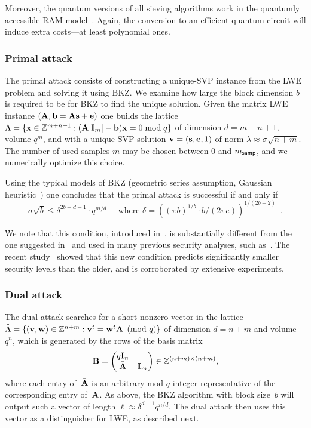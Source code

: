\documentclass{iacrcc}
\begin{document}
Moreover, the quantum versions of all sieving algorithms work in the
quantumly accessible RAM model~\cite{LMP15}. Again, the conversion to
an efficient quantum circuit will induce extra costs---at least
polynomial ones.

\subsubsection{Primal attack}

The primal attack consists of constructing a unique-SVP instance from
the LWE problem and solving it using BKZ. We examine how large the
block dimension $b$ is required to be for BKZ to find the unique
solution. Given the matrix LWE instance
$( \mathbf{A},\mathbf{b} = \mathbf{A} \mathbf{s} + \mathbf{e})$ one builds the lattice
$\Lambda = \{ \mathbf{x} \in \mathbb Z^{m+n+1} : ( \mathbf{A} | \mathbf{I}_m | - \mathbf{b})
\mathbf{x} = 0 \bmod q \}$ of dimension $d = m + n + 1$, volume $q^m$, and
with a unique-SVP solution $\mathbf{v} = (\mathbf{s}, \mathbf{e}, 1 )$ of norm
$\lambda \approx \sigma \sqrt{n+m}$. The number of used samples $m$
may be chosen between $0$ and $m_{\mathsf{samp}}$, and we numerically optimize
this choice.

Using the typical models of BKZ (geometric series assumption, Gaussian
heuristic~\cite{ChenThesis,albrecht15:_concrete_lwe}) one concludes
that the primal attack is successful if and only if
\begin{equation}
  \label{eqn:primal_attack_cond}
  \sigma \sqrt b \leq \delta^{2b-d -1} \cdot q^{m/d} \quad \text{ where } \delta = ((\pi b)^{1/b} \cdot b/(2\pi e))^{1/(2b-2)} \enspace .
\end{equation}

We note that this condition, introduced in~\cite{USENIX:ADPS16}, is
substantially different from the one suggested in~\cite{EC:GamNgu08}
and used in many previous security analyses, such
as~\cite{albrecht15:_concrete_lwe}. The recent study~\cite{AC:AGVW17}
showed that this new condition predicts significantly smaller security
levels than the older, and is corroborated by extensive experiments.

\subsubsection{Dual attack}
\label{sec:dual-attack}

The dual attack searches for a short nonzero vector in the lattice
$\hat \Lambda = \{ (\mathbf{v}, \mathbf{w}) \in \mathbb{Z}^{n + m} : \mathbf{v}^{t} =
\mathbf{w}^{t} \mathbf{A} \pmod q\}$ of dimension $d=n+m$ and volume~$q^{n}$,
which is generated by the rows of the basis matrix
\[ \mathbf{B} =
  \begin{pmatrix}
    q \mathbf{I}_{n} & \\ \bar {\mathbf{A}} & \mathbf{I}_{m}
  \end{pmatrix}  \in \mathbb{Z}^{(n+m) \times (n+m)} ,
\]
where each entry of~$\bar {\mathbf{A}}$ is an arbitrary mod-$q$ integer
representative of the corresponding entry of~$\mathbf{A}$.  As above, the
BKZ algorithm with block size~$b$ will output such a vector of length
$\ell \approx \delta^{d-1} q^{n/d}$. The dual attack then uses this
vector as a distinguisher for LWE, as described next.
\end{document}
